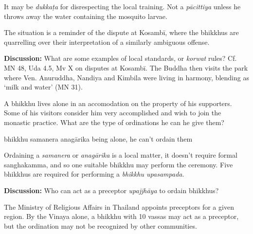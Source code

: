 \begin{exam}{\autoExamName}
\begin{problem}
\begin{solution}
  It may be \emph{dukkaṭa} for disrespecting the local training. Not a \emph{pācittiya}
  unless he throws away the water containing the mosquito larvae.

  The situation is a reminder of the dispute at Kosambī,
  where the bhikkhus are quarrelling over their interpretation of a similarly ambiguous offense.
\end{solution}

\end{problem}

\bigskip

\textbf{Discussion:} What are some examples of local standards, or \emph{korwat}
rules? Cf. MN 48, Uda 4.5, Mv X on disputes at Kosambī. The Buddha then visits
the park where Ven. Anuruddha, Nandiya and Kimbila were living in harmony,
blending as `milk and water' (MN 31).

\problemDivide

\begin{problem}

  A bhikkhu lives alone in an accomodation on the property of his supporters. Some of
  his visitors consider him very accomplished and wish to join the monastic practice.
  What are the type of ordinations he can he give them?

  \bigskip

  \begin{manswers}{4}
    \bChoices
     bhikkhu\eAns
     samanera\eAns
     anagārika\eAns
     being alone, he can't ordain them\eAns
    \eChoices
  \end{manswers}

\begin{solution}
  Ordaining a \emph{samanera} or \emph{anagārika} is a local matter,
  it doesn't require formal sanghakamma, and so one suitable bhikkhu may perform the ceremony.
  Five bhikkhus are required for performing a \emph{bhikkhu upasampada}.
\end{solution}

\bigskip

\textbf{Discussion:} Who can act as a preceptor \emph{upajjhāya} to ordain bhikkhus?

\begin{solution}
  The Ministry of Religious Affairs in Thailand appoints preceptors for a given region.
  By the Vinaya alone, a bhikkhu with 10 vassas may act as a preceptor, but the
  ordination may not be recognized by other communities.
\end{solution}

\end{problem}

\end{exam}
